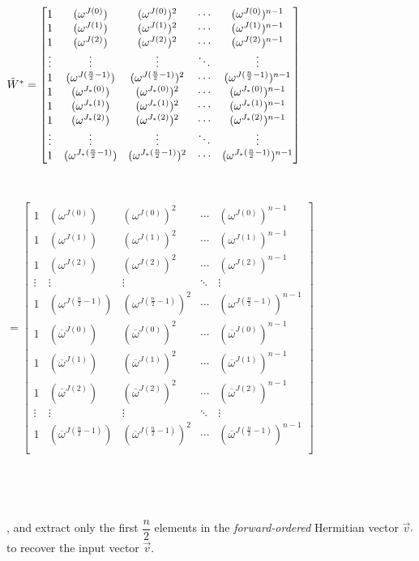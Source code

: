 \begin{tcolorbox}[title={\textbf{\tboxlabel{\ref*{subsec:ckks-encoding-decoding}} CKKS's Encoding and Decoding}}]
\noindent $\tilde{W}^* = \begin{bmatrix}
1 & (\omega^{J(0)}) & (\omega^{J(0)})^2 & \cdots & (\omega^{J(0)})^{n-1}\\
1 & (\omega^{J(1)}) & (\omega^{J(1)})^2 & \cdots & (\omega^{J(1)})^{n-1}\\
1 & (\omega^{J(2)}) & (\omega^{J(2)})^2 & \cdots & (\omega^{J(2)})^{n-1}\\
\vdots & \vdots & \vdots & \ddots & \vdots \\
1 & (\omega^{J(\frac{n}{2}-1)}) & (\omega^{J(\frac{n}{2}-1)})^2 & \cdots & (\omega^{J(\frac{n}{2}-1)})^{n-1}\\
1 & (\omega^{J_*(0)}) & (\omega^{J_*(0)})^2 & \cdots & (\omega^{J_*(0)})^{n-1}\\
1 & (\omega^{J_*(1)}) & (\omega^{J_*(1)})^2 & \cdots & (\omega^{J_*(1)})^{n-1}\\
1 & (\omega^{J_*(2)}) & (\omega^{J_*(2)})^2 & \cdots & (\omega^{J_*(2)})^{n-1}\\
\vdots & \vdots & \vdots & \ddots & \vdots \\
1 & (\omega^{J_*(\frac{n}{2}-1)}) & (\omega^{J_*(\frac{n}{2}-1)})^2 & \cdots & (\omega^{J_*(\frac{n}{2}-1)})^{n-1}\\
\end{bmatrix}$

$ $

\noindent $ = \begin{bmatrix}
1 & (\omega^{J(0)}) & (\omega^{J(0)})^2 & \cdots & (\omega^{J(0)})^{n-1}\\
1 & (\omega^{J(1)}) & (\omega^{J(1)})^2 & \cdots & (\omega^{J(1)})^{n-1}\\
1 & (\omega^{J(2)}) & (\omega^{J(2)})^2 & \cdots & (\omega^{J(2)})^{n-1}\\
\vdots & \vdots & \vdots & \ddots & \vdots \\
1 & (\omega^{J(\frac{n}{2}-1)}) & (\omega^{J(\frac{n}{2}-1)})^2 & \cdots & (\omega^{J(\frac{n}{2}-1)})^{n-1}\\
1 & (\overline\omega^{J(0)}) & (\overline\omega^{J(0)})^2 & \cdots & (\overline\omega^{J(0)})^{n-1}\\
1 & (\overline\omega^{J(1)}) & (\overline\omega^{J(1)})^2 & \cdots & (\overline\omega^{J(1)})^{n-1}\\
1 & (\overline\omega^{J(2)}) & (\overline\omega^{J(2)})^2 & \cdots & (\overline\omega^{J(2)})^{n-1}\\
\vdots & \vdots & \vdots & \ddots & \vdots \\
1 & (\overline\omega^{J(\frac{n}{2}-1)}) & (\overline\omega^{J(\frac{n}{2}-1)})^2 & \cdots & (\overline\omega^{J(\frac{n}{2}-1)})^{n-1}\\
\end{bmatrix}$

$ $

$ $

, and extract only the first $\dfrac{n}{2}$ elements in the \textit{forward-ordered} Hermitian vector $\vec{v}_{'}$ to recover the input vector $\vec{v}$. 

\end{tcolorbox}

